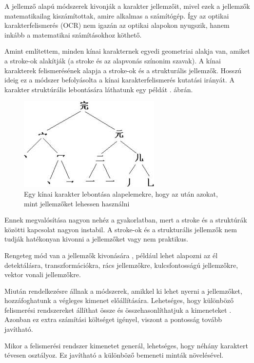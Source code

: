 A jellemző alapú módszerek \cite{bunke1997handbook} kivonják a karakter jellemzőit, mivel ezek a jellemzők matematikailag kiszámítottak, amire alkalmas a számítógép. Így az optikai karakterfelismerés (OCR) nem igazán az optikai alapokon nyugszik, hanem inkább a matematikai számításokhoz köthető.

Amint említettem, minden kínai karakternek egyedi geometriai alakja van, amiket a stroke-ok alakítják (a stroke és az alapvonás színonim szavak). A kínai karakterek felismerésének alapja a stroke-ok és a strukturális jellemzők. Hosszú ideig ez a módszer befolyásolta a kínai karakterfelismerés kutatási irányát.
A karakter struktúrális lebontására láthatunk egy példát . ábrán.

\begin{figure}[h]
\centering
\includegraphics[scale=0.8]{images/ocr_features}
\caption{Egy kínai karakter lebontása alapelemekre, hogy az után azokat, mint jellemzőket lehessen használni}
\label{fig:ocr_features}
\end{figure}

Ennek megvalósítása nagyon nehéz a gyakorlatban, mert a stroke és a struktúrák közötti kapcsolat nagyon instabil. A stroke-ok és a strukturális jellemzők nem tudják hatékonyan kivonni a jellemzőket vagy nem praktikus.

Rengeteg mód van a jellemzők kivonására \cite{bunke1997handbook}, például lehet alapozni az él detektálásra, transzformációkra, rács jellemzőkre, kulcsfontosságú jellemzőkre, vektor vonali jellemzőkre.

Miután rendelkezésre állnak a módszerek, amikkel ki lehet nyerni a jellemzőket, hozzáfoghatunk a végleges kimenet előállítására. Lehetséges, hogy különböző felismerési rendszereket állíthat össze és összehasonlíthatjuk a kimeneteket \cite{liu2013online} \cite{dong2005improved} \cite{zhong2015high}. Azonban ez extra számítási költséget igényel, viszont a pontosság tovább javítható.

Mikor a felismerési rendszer kimenetet generál, lehetséges, hogy néhány karaktert tévesen osztályoz. Ez javítható a különböző bemeneti minták növelésével.

